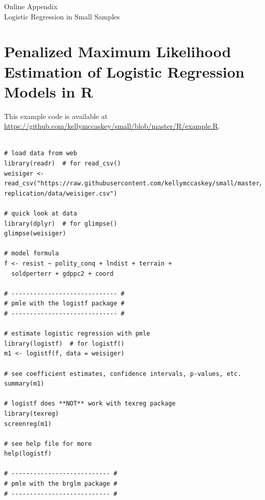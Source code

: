\documentclass[12pt]{article}
\begin{document}
\singlespace 
\newpage
\normalsize


%

\newpage
\begin{appendix}
\begin{center}
{\LARGE Online Appendix}\\
\vspace{3mm}
{\large Logistic Regression in Small Samples}\\\vspace{2mm}
\end{center}

\section{Penalized Maximum Likelihood Estimation of Logistic Regression Models in R}\label{sec:pmle-in-R}

This example code is available at \href{https://github.com/kellymccaskey/small/blob/master/R/example.R}{https://github.com/kellymccaskey/small/blob/master/R/example.R}.

\begin{footnotesize}
\begin{verbatim}

# load data from web
library(readr)  # for read_csv()
weisiger <- read_csv("https://raw.githubusercontent.com/kellymccaskey/small/master/weisiger-replication/data/weisiger.csv") 

# quick look at data
library(dplyr)  # for glimpse()
glimpse(weisiger)

# model formula
f <- resist ~ polity_conq + lndist + terrain + 
  soldperterr + gdppc2 + coord

# ----------------------------- #
# pmle with the logistf package #
# ----------------------------- #

# estimate logistic regression with pmle
library(logistf)  # for logistf()
m1 <- logistf(f, data = weisiger)

# see coefficient estimates, confidence intervals, p-values, etc.
summary(m1)

# logistf does **NOT** work with texreg package
library(texreg)
screenreg(m1)

# see help file for more
help(logistf)

# --------------------------- #
# pmle with the brglm package #
# --------------------------- #


\end{verbatim}
\end{footnotesize}
\end{appendix}
\end{document}
